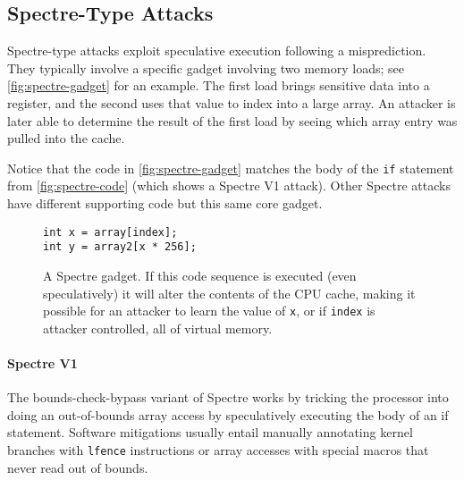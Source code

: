 
\subsection{Spectre-Type Attacks}

Spectre-type attacks exploit speculative execution following a misprediction.
They typically involve a specific gadget involving two memory loads; see \autoref{fig:spectre-gadget} for an example.
The first load brings sensitive data into a register, and the second uses that value to index into a large array.
An attacker is later able to determine the result of the first load by seeing which array entry was pulled into the cache.

Notice that the code in \autoref{fig:spectre-gadget} matches the body of the \texttt{if} statement from \autoref{fig:spectre-code} (which shows a Spectre V1 attack).
Other Spectre attacks have different supporting code but this same core gadget.

\begin{figure}[h]
\begin{lstlisting}
int x = array[index];
int y = array2[x * 256];
\end{lstlisting}
\caption{A Spectre gadget. If this code sequence is executed (even speculatively) it will alter the contents of the CPU cache, making it possible for an attacker to learn the value of \texttt{x}, or if \texttt{index} is attacker controlled, all of virtual memory.}
\label{fig:spectre-gadget}
\end{figure}

\paragraph{Spectre V1~\cite{kocher:spectre}}
The bounds-check-bypass variant of Spectre works by tricking the processor into doing an out-of-bounds array access by speculatively executing the body of an if statement.
Software mitigations usually entail manually annotating kernel branches with \texttt{lfence} instructions or array accesses with special macros that never read out of bounds.

